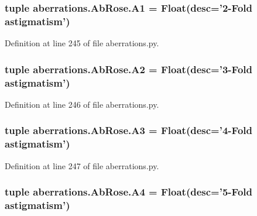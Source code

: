 \hypertarget{classaberrations_1_1_ab_rose_ad3a7ac0dcbe49d6e8c6636d4655d61d7}{
\subsubsection[{A1}]{\setlength{\rightskip}{0pt plus 5cm}tuple aberrations.\-Ab\-Rose.\-A1 = Float(desc='2-\/Fold astigmatism')\hspace{0.3cm}{\ttfamily [static]}}}\label{classaberrations_1_1_ab_rose_ad3a7ac0dcbe49d6e8c6636d4655d61d7}


Definition at line 245 of file aberrations.\-py.

\hypertarget{classaberrations_1_1_ab_rose_a06e49fdcb9afae5e0581fb6d1fac6ed7}{
\subsubsection[{A2}]{\setlength{\rightskip}{0pt plus 5cm}tuple aberrations.\-Ab\-Rose.\-A2 = Float(desc='3-\/Fold astigmatism')\hspace{0.3cm}{\ttfamily [static]}}}\label{classaberrations_1_1_ab_rose_a06e49fdcb9afae5e0581fb6d1fac6ed7}


Definition at line 246 of file aberrations.\-py.

\hypertarget{classaberrations_1_1_ab_rose_af3a58864fc14fdb8e09c8104313c209e}{
\subsubsection[{A3}]{\setlength{\rightskip}{0pt plus 5cm}tuple aberrations.\-Ab\-Rose.\-A3 = Float(desc='4-\/Fold astigmatism')\hspace{0.3cm}{\ttfamily [static]}}}\label{classaberrations_1_1_ab_rose_af3a58864fc14fdb8e09c8104313c209e}


Definition at line 247 of file aberrations.\-py.

\hypertarget{classaberrations_1_1_ab_rose_a928ea5389201dd3b1212eafd73412774}{
\subsubsection[{A4}]{\setlength{\rightskip}{0pt plus 5cm}tuple aberrations.\-Ab\-Rose.\-A4 = Float(desc='5-\/Fold astigmatism')\hspace{0.3cm}{\ttfamily [static]}}}\label{classaberrations_1_1_ab_rose_a928ea5389201dd3b1212eafd73412774}


